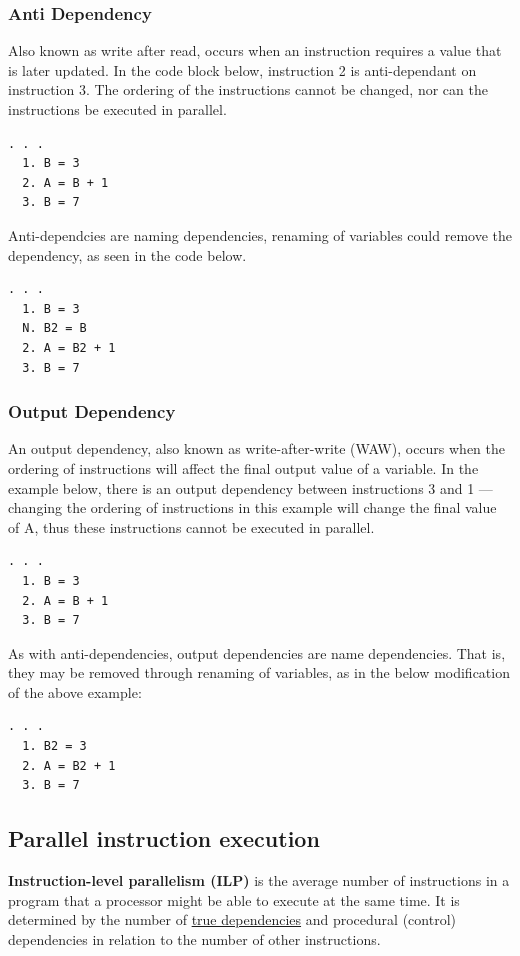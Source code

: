 \subsubsection{Anti Dependency}
Also known as write after read, occurs when an instruction requires a value that is later updated. In the code block below, instruction 2 is anti-dependant on instruction 3. The ordering of the instructions cannot be changed, nor can the instructions be executed in parallel. 
\begin{lstlisting}[frame=single]  % Start your code-block
  . . .
  1. B = 3
  2. A = B + 1
  3. B = 7
\end{lstlisting}

Anti-dependcies are naming dependencies, renaming of variables could remove the dependency, as seen in the code below. \\

\begin{lstlisting}[frame=single]  % Start your code-block
  . . .
  1. B = 3
  N. B2 = B
  2. A = B2 + 1
  3. B = 7
\end{lstlisting}

\subsubsection{Output Dependency}
An output dependency, also known as write-after-write (WAW), occurs when the ordering of instructions will affect the final output value of a variable. In the example below, there is an output dependency between instructions 3 and 1 — changing the ordering of instructions in this example will change the final value of A, thus these instructions cannot be executed in parallel.

\begin{lstlisting}[frame=single]  % Start your code-block
  . . .
  1. B = 3
  2. A = B + 1
  3. B = 7
\end{lstlisting}

As with anti-dependencies, output dependencies are name dependencies. That is, they may be removed through renaming of variables, as in the below modification of the above example:

\begin{lstlisting}[frame=single]  % Start your code-block
  . . .
  1. B2 = 3
  2. A = B2 + 1
  3. B = 7
\end{lstlisting}

\subsection{Parallel instruction execution}
\textbf{Instruction-level parallelism (ILP)} is the average number of instructions in a program that a processor might be able to execute at the same time. It is determined by the number of \underline{true dependencies} and procedural (control) dependencies in relation to the number of other instructions.

